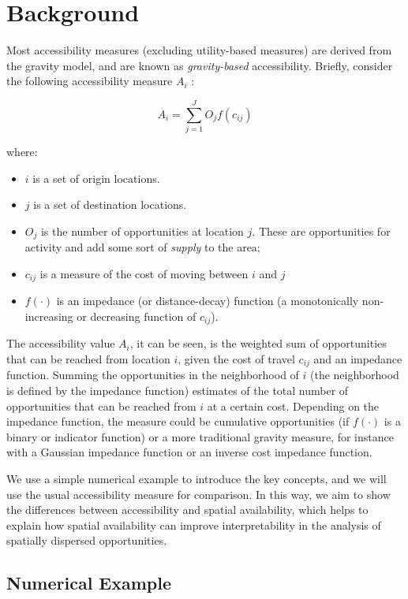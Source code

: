 \documentclass[]{elsarticle} %
\providecommand{\tightlist}{%
  \setlength{\itemsep}{0pt}\setlength{\parskip}{0pt}}
\begin{document}
\hypertarget{background}{%
\section{Background}\label{background}}

Most accessibility measures (excluding utility-based measures) are
derived from the gravity model, and are known as \emph{gravity-based}
accessibility. Briefly, consider the following accessibility measure
\(A_i\) :

\[
A_i = \sum_{j=1}^JO_jf(c_{ij})
\]

\noindent where:

\begin{itemize}
\tightlist
\item
  \(i\) is a set of origin locations.
\item
  \(j\) is a set of destination locations.
\item
  \(O_j\) is the number of opportunities at location \(j\). These are
  opportunities for activity and add some sort of \emph{supply} to the
  area;
\item
  \(c_{ij}\) is a measure of the cost of moving between \(i\) and \(j\)
\item
  \(f(\cdot)\) is an impedance (or distance-decay) function (a
  monotonically non-increasing or decreasing function of \(c_{ij}\)).
\end{itemize}

The accessibility value \(A_i\), it can be seen, is the weighted sum of
opportunities that can be reached from location \(i\), given the cost of
travel \(c_{ij}\) and an impedance function. Summing the opportunities
in the neighborhood of \(i\) (the neighborhood is defined by the
impedance function) estimates of the total number of opportunities that
can be reached from \(i\) at a certain cost. Depending on the impedance
function, the measure could be cumulative opportunities (if \(f(\cdot)\)
is a binary or indicator function) or a more traditional gravity
measure, for instance with a Gaussian impedance function or an inverse
cost impedance function.

We use a simple numerical example to introduce the key concepts, and we
will use the usual accessibility measure for comparison. In this way, we
aim to show the differences between accessibility and spatial
availability, which helps to explain how spatial availability can
improve interpretability in the analysis of spatially dispersed
opportunities.

\hypertarget{numerical-example}{%
\subsection{Numerical Example}\label{numerical-example}}
\end{document}
